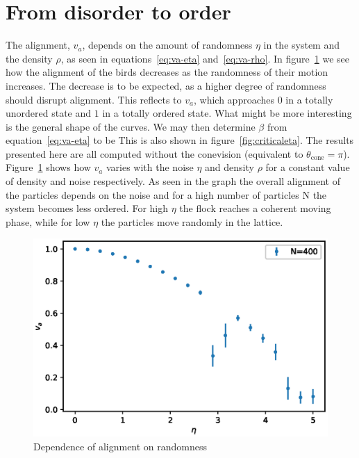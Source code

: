 \documentclass[twoside,twocolumn]{article}
\begin{document}
\section{From disorder to order}

The alignment, $v_a$, depends on the amount of randomness $\eta$ in the system 
and the density $\rho$, as seen in equations~\eqref{eq:va-eta} and~\eqref{eq:va-rho}.
In figure~\ref{fig:va_over_eta} we see how the alignment of 
the birds decreases as the randomness of their motion increases. The decrease 
is to be expected, as a higher degree of randomness should disrupt alignment. 
This reflects to $v_a$, which approaches $0$ in a totally unordered state and $1$
in a totally ordered state.
What might be more interesting is the general shape of the curves. We may then 
determine $\beta$ from equation~\eqref{eq:va-eta} to be 
This is also shown in figure~\ref{fig:criticaleta}. The results presented here 
are all computed without the conevision (equivalent to $\theta_{\text{cone}} = \pi$). 
Figure~\ref{fig:va_over_eta} shows how $v_a$ varies with the noise $\eta$ and 
density $\rho$ for a constant value of density and noise respectively.
As seen in the graph the overall alignment of the particles depends 
on the noise and for a high number of particles N the system becomes less ordered. 
For high $\eta$ the flock reaches a coherent moving phase, while for low $\eta$ 
the particles move randomly in the lattice.  


\begin{figure}[!htb]
  \centering
  \includegraphics[width=\columnwidth]{va_over_eta}
  \caption{Dependence of alignment on randomness}\label{fig:va_over_eta}
\end{figure}
\end{document}
